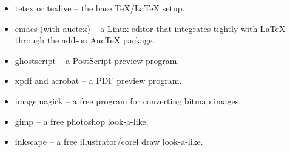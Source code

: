 \documentclass[11pt,a4paper,twoside]{book}
\begin{document}
\begin{itemize}
\item tetex or texlive -- the base \TeX{}/\LaTeX{} setup.
\item emacs (with auctex) -- a Linux editor that integrates tightly with \LaTeX{} through the add-on AucTeX package.
\item ghostscript -- a PostScript preview program.
\item xpdf and acrobat -- a PDF preview program.
\item imagemagick -- a free program for converting bitmap images.
\item gimp -- a free photoshop look-a-like.
\item inkscape -- a free illustrator/corel draw look-a-like.
\end{itemize}
\end{document}
